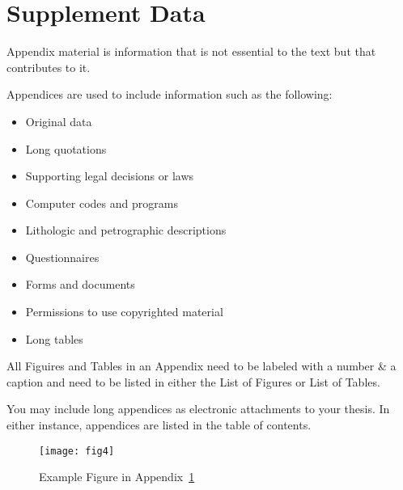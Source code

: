 \chapter{Supplement Data}\label{appendix:1}

Appendix material is information that is not
essential to the text but that contributes to it.

Appendices are used to include information such as the following:

\begin{itemize}
	\item Original data
	\item Long quotations 
	\item Supporting legal decisions or laws 
	\item Computer codes and programs 
	\item Lithologic and petrographic descriptions
	\item Questionnaires 	
	\item Forms and documents 
	\item Permissions to use copyrighted material
	\item Long tables
\end{itemize}


All Figuires and  Tables in an Appendix need to be labeled with a number \& a caption and need to be listed in either the List of Figures or List of Tables.

You may include long appendices as electronic attachments to your thesis. In either instance, appendices are listed in the table of contents.

\begin{figure}[h]
	\centering
	\texttt{[image: fig4]}
	\caption{Example Figure in Appendix~\ref{appendix:1}}
\end{figure}